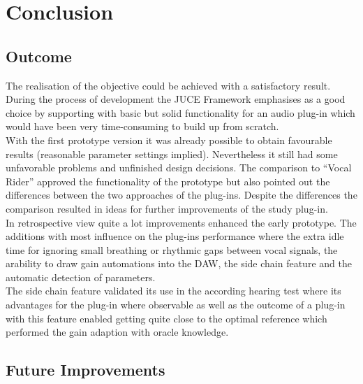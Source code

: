 \chapter{Conclusion}
\label{chapter:conclusion}

\section{Outcome}

The realisation of the objective could be achieved with a satisfactory result. During the process of development the JUCE Framework emphasises as a good choice by supporting with basic but solid functionality for an audio plug-in which would have been very time-consuming to build up from scratch.\\
With the first prototype version it was already possible to obtain favourable results (reasonable parameter settings implied). Nevertheless it still had some unfavorable problems and unfinished design decisions. The comparison to “Vocal Rider” approved the functionality of the prototype but also pointed out the differences between the two approaches of the plug-ins. Despite the differences the comparison resulted in ideas for further improvements of the study plug-in.\\
In retrospective view quite a lot improvements enhanced the early prototype. The additions with most influence on the plug-ins performance where the extra idle time for ignoring small breathing or rhythmic gaps between vocal signals, the arability to draw gain automations into the DAW, the side chain feature and the automatic detection of parameters.\\
The side chain feature validated its use in the according hearing test where its advantages for the plug-in where observable as well as the outcome of a plug-in with this feature enabled getting quite close to the optimal reference which performed the gain adaption with oracle knowledge.\\

\section{Future Improvements}

